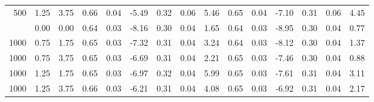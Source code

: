 \documentclass[10,a4paperpaper,]{article}
\begin{document}
\begin{table}
{\begin{tabular}[t]{rrrrrrrrrrrrrrr}
500 & 1.25 & 3.75 & 0.66 & 0.04 & -5.49 & 0.32 & 0.06 & 5.46 & 0.65 & 0.04 & -7.10 & 0.31 & 0.06 & 4.45\\
\addlinespace
1000 & 0.00 & 0.00 & 0.64 & 0.03 & -8.16 & 0.30 & 0.04 & 1.65 & 0.64 & 0.03 & -8.95 & 0.30 & 0.04 & 0.77\\
1000 & 0.75 & 1.75 & 0.65 & 0.03 & -7.32 & 0.31 & 0.04 & 3.24 & 0.64 & 0.03 & -8.12 & 0.30 & 0.04 & 1.37\\
1000 & 0.75 & 3.75 & 0.65 & 0.03 & -6.69 & 0.31 & 0.04 & 2.21 & 0.65 & 0.03 & -7.46 & 0.30 & 0.04 & 0.88\\
1000 & 1.25 & 1.75 & 0.65 & 0.03 & -6.97 & 0.32 & 0.04 & 5.99 & 0.65 & 0.03 & -7.61 & 0.31 & 0.04 & 3.11\\
1000 & 1.25 & 3.75 & 0.66 & 0.03 & -6.21 & 0.31 & 0.04 & 4.08 & 0.65 & 0.03 & -6.92 & 0.31 & 0.04 & 2.17\\
\bottomrule
\end{tabular}}
\end{table}
\end{document}
